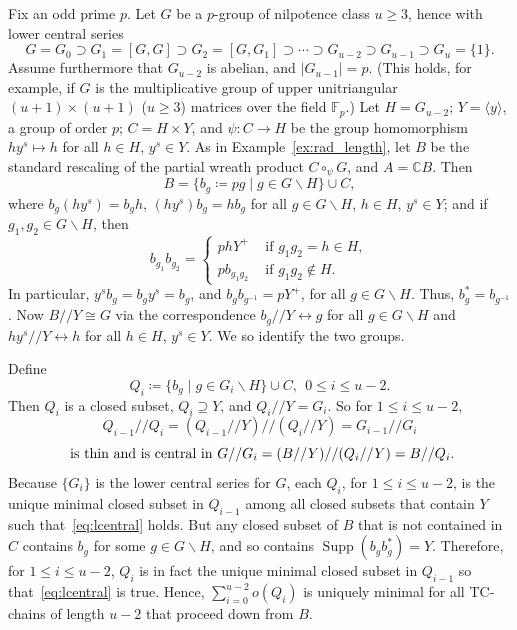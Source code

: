 \documentclass[ALCO,ThmDefs,Unicode,epreuves]{cedram}
\DeclareMathOperator{\Supp}{Supp}
\newcommand{\C}{{\mathbb C}}
\newcommand{\F}{{\mathbb F}}
\begin{document}
\begin{exam}
\label{ex:lower}
Fix an odd prime $p$. Let $G$ be a $p$-group of nilpotence class $u
\geq 3$, hence with lower central series
\[
G = G_0 \supset G_1 = [G,G] \supset G_2 = [G, G_1] \supset \cdots
\supset G_{u-2} \supset G_{u-1} \supset G_u = \{1\}.
\]
Assume furthermore that $G_{u-2}$ is abelian, and $|G_{u-1}| = p$.
(This holds, for example, if $G$ is the multiplicative group of upper
unitriangular $(u+1)\times(u+1)$ ($u \geq 3$) matrices over the field
${\F}_p$.) Let $H = G_{u-2}$; $Y = \langle y \rangle$, a group of order
$p$; $C = H\times Y$, and $\psi: C \rightarrow H$ be the group
homomorphism $hy^s \mapsto h$ for all $h \in H$, $y^s \in Y$. As in
Example~\ref{ex:rad_length}, let $B$ be the standard rescaling of the
partial wreath product $C \circ_{\psi} G$, and $A = {\C}B$. Then
\[
B = \{b_g \coloneqq pg \mid g \in G\backslash H\} \cup C,
\]
where $b_g(hy^s) = b_gh$, $(hy^s)b_g = hb_g$ for all $g \in G\backslash
H$, $h \in H$, $y^s \in Y$; and if $g_1, g_2 \in G\backslash H$, then
\[
b_{g_1}b_{g_2} 
= \begin{cases}
phY^+ & \mbox{ if }g_1g_2 = h \in H,\\
pb_{g_1g_2} & \mbox{ if }g_1g_2 \notin H. 
\end{cases}
\] 
In particular, $y^sb_g = b_gy^s = b_g$, and $b_gb_{g^{-1}} = pY^+$, for
all $g \in G\backslash H$. Thus, $b_g^* = b_{g^{-1}}$. Now $B//Y \cong
G$ via the correspondence $b_g//Y \leftrightarrow g$ for all $g \in
G\backslash H$ and $hy^s//Y \leftrightarrow h$ for all $h \in H$, $y^s
\in Y$. We so identify the two groups.

Define 
\[
Q_i \coloneqq \{b_g \mid g \in G_i\backslash H\} \cup C, \ \ 0 \leq i \leq
u-2.
\]
Then $Q_i$ is a closed subset, $Q_i \supseteq Y$, and $Q_i//Y = G_i$.
So for $1 \leq i \leq u-2$,
\[
Q_{i-1}//Q_i = (Q_{i-1}//Y)//(Q_i//Y) =
G_{i-1}//G_i
\]
\begin{equation}
\label{eq:lcentral}
 \mbox{ is thin and is central in } \\ G//G_i = (B//Y)//(Q_i//Y)
= B//Q_i. 
\end{equation}
Because $\{G_i\}$ is the lower central series for $G$, each $Q_i$, for
$1 \leq i \leq u-2$, is the unique minimal closed subset in $Q_{i-1}$ 
among all closed subsets that contain $Y$ such that~\eqref{eq:lcentral}
holds. But any closed subset of $B$ that is not contained in $C$
contains $b_g$ for some $g \in G\backslash H$, and so contains
$\Supp(b_gb_g^*) = Y$. Therefore, for $1 \leq i \leq u-2$, $Q_i$
is in fact the unique minimal closed subset in $Q_{i-1}$ so that~\eqref{eq:lcentral} is true. Hence, $\sum_{i=0}^{u-2}o(Q_i)$ is
uniquely minimal
for all TC-chains of length $u-2$ that proceed down from $B$. 


\end{exam}
\end{document}
